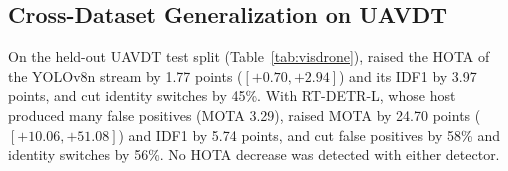 \subsection{Cross-Dataset Generalization on UAVDT}\label{sec:visdrone}
On the held-out UAVDT test split (Table~\ref{tab:visdrone}), \scl{} raised the HOTA of the YOLOv8n
stream by 1.77 points ($[+0.70,+2.94]$) and its IDF1 by 3.97 points, and cut identity switches by
45\%. With RT-DETR-L, whose host produced many false positives (MOTA 3.29), \scl{} raised MOTA by
24.70 points ($[+10.06,+51.08]$) and IDF1 by 5.74 points, and cut false positives by 58\% and
identity switches by 56\%. No HOTA decrease was detected with either detector.

